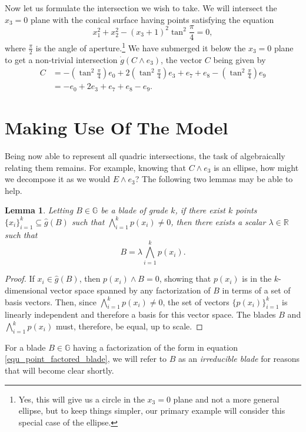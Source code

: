 \documentclass{birkjour}
\newtheorem{lem}[thm]{Lemma}
\theoremstyle{definition}
\theoremstyle{remark}
\numberwithin{equation}{section}
\newcommand{\R}{\mathbb{R}}
\newcommand{\G}{\mathbb{G}}
\newcommand{\gd}{\dot{g}}
\newcommand{\gh}{\hat{g}}
\begin{document}
Now let us formulate the intersection we wish to take.  We will
intersect the $x_3=0$ plane with the conical surface having points satisfying the equation
\begin{equation}\label{equ_conical_surface}
x_1^2+x_2^2 - (x_3+1)^2\tan^2\frac{\pi}{4} = 0,
\end{equation}
where $\frac{\pi}{2}$ is the angle of aperture.\footnote{Yes, this will give
us a circle in the $x_3=0$ plane and not a more general ellipse, but to keep things
simpler, our primary example will consider this special case of the ellipse.}  We have submerged it
below the $x_3=0$ plane to get a non-trivial intersection $\gd(C\wedge e_3)$,
the vector $C$ being given by
\begin{align*}
C &= -\left(\tan^2\frac{\pi}{4}\right)e_0 + 2\left(\tan^2\frac{\pi}{4}\right)e_3 + e_7 + e_8 - \left(\tan^2\frac{\pi}{4}\right)e_9 \\
 &= -e_0 + 2e_3 + e_7 + e_8 - e_9.
\end{align*}

\section{Making Use Of The Model}

Being now able to represent all quadric intersections, the task of
algebraically relating them remains.  For example, knowing that
$C\wedge e_3$ is an ellipse, how might we decompose it
as we would $E\wedge e_3$?  The following two lemmas may be able to help.
\begin{lem}\label{lma_point_factored_blade}
Letting $B\in\G$ be a blade of grade $k$, if there exist $k$ points $\{x_i\}_{i=1}^k\subseteq\gh(B)$
such that $\bigwedge_{i=1}^k p(x_i)\neq 0$, then there exists a scalar $\lambda\in\R$
such that
\begin{equation}\label{equ_point_factored_blade}
B = \lambda\bigwedge_{i=1}^k p(x_i).
\end{equation}
\end{lem}
\begin{proof}
If $x_i\in\gh(B)$, then $p(x_i)\wedge B=0$, showing that $p(x_i)$ is in the $k$-dimensional vector
space spanned by any factorization of $B$ in terms of a set of basis vectors.
Then, since $\bigwedge_{i=1}^k p(x_i)\neq 0$,
the set of vectors $\{p(x_i)\}_{i=1}^k$ is linearly independent and therefore
a basis for this vector space.  The blades $B$ and $\bigwedge_{i=1}^k p(x_i)$
must, therefore, be equal, up to scale.
\end{proof}
For a blade $B\in\G$ having a factorization of the form in equation \eqref{equ_point_factored_blade},
we will refer to $B$ as an {\it irreducible blade} for reasons that will become clear shortly.
\end{document}
